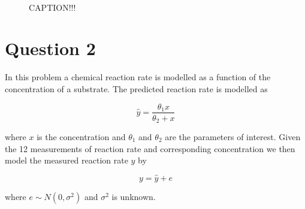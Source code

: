 \begin{figure}
    \mbox{\vspace{5mm}}
    \mbox{   \quad 
            }
    \caption{CAPTION!!!}
    \label{fig:ex13}
\end{figure}


\section*{Question 2}

In this problem a chemical reaction rate is modelled as a function of the concentration of a substrate. The predicted reaction rate is modelled as

\begin{equation*}
    \hat{y} = \frac{\theta_1 x}{\theta_2 + x}
\end{equation*}

where $x$ is the concentration and $\theta_1$ and $\theta_2$ are the parameters of interest. Given the 12 measurements of reaction rate and corresponding concentration we then model the measured reaction rate $y$ by

\begin{equation}\label{eq:ex21-base-model}
    y = \hat{y} + e
\end{equation}

where $e\sim N(0,\sigma^2)$ and $\sigma^2$ is unknown.

